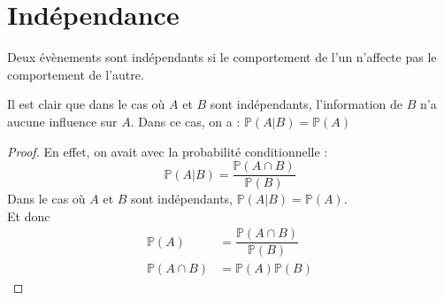 \newpage
\section{Indépendance}

Deux évènements sont indépendants si le comportement de l'un n'affecte pas le comportement de l'autre.

Il est clair que dans le cas où $A$ et $B$ sont indépendants, l'information de $B$ n'a 
aucune influence sur $A$. Dans ce cas, on a :
$\mathbb{P}(A|B) = \mathbb{P}(A)$\\

\vspace{2cm}
\begin{tcolorbox}[colback=cyan!5, colframe=cyan!70!blue, title=Définition de l'indépendance de deux évènements]
\end{tcolorbox}

\begin{proof}
    En effet, on avait avec la probabilité conditionnelle :\\
\begin{equation*}
    \mathbb{P}(A|B) = \dfrac{\mathbb{P}(A\cap B)}{\mathbb{P}(B)} 
\end{equation*}
Dans le cas où $A$ et $B$ sont indépendants, $\mathbb{P}(A|B) = \mathbb{P}(A)$.\\
Et donc 
\begin{align*}
    \mathbb{P}(A)& = \dfrac{\mathbb{P}(A\cap B)}{\mathbb{P}(B)} \\
    \mathbb{P}(A\cap B) &= \mathbb{P}(A)\mathbb{P}(B)
\end{align*}
\end{proof}

